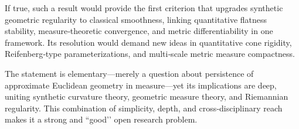 If true, such a result would provide the first criterion that upgrades synthetic geometric regularity to classical smoothness, linking quantitative flatness stability, measure‑theoretic convergence, and metric differentiability in one framework. Its resolution would demand new ideas in quantitative cone rigidity, Reifenberg‑type parameterizations, and multi‑scale metric measure compactness.  

The statement is elementary—merely a question about persistence of approximate Euclidean geometry in measure—yet its implications are deep, uniting synthetic curvature theory, geometric measure theory, and Riemannian regularity. This combination of simplicity, depth, and cross‑disciplinary reach makes it a strong and “good’’ open research problem.